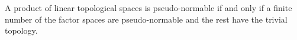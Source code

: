 A product of linear topological spaces is pseudo-normable if and only if a finite number of the factor spaces are pseudo-normable and the rest have the trivial topology.
